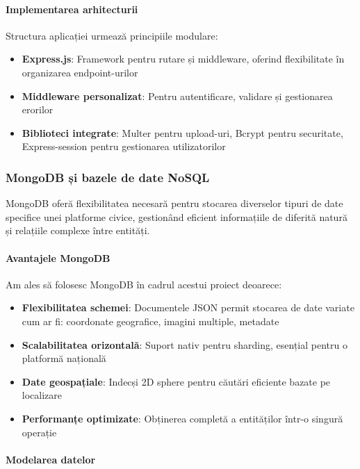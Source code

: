 \documentclass[12pt,a4paper]{report}
\begin{document}
\paragraph{Implementarea arhitecturii}

Structura aplicației urmează principiile modulare:

\begin{itemize}
    \item \textbf{Express.js}: Framework pentru rutare și middleware, oferind flexibilitate în organizarea endpoint-urilor
    \item \textbf{Middleware personalizat}: Pentru autentificare, validare și gestionarea erorilor
    \item \textbf{Biblioteci integrate}: Multer pentru upload-uri, Bcrypt pentru securitate, Express-session pentru gestionarea utilizatorilor
\end{itemize}

\subsubsection{MongoDB și bazele de date NoSQL}

MongoDB oferă flexibilitatea necesară pentru stocarea diverselor tipuri de date specifice unei platforme civice, gestionând eficient informațiile de diferită natură și relațiile complexe între entități.

\paragraph{Avantajele MongoDB}

Am ales să folosesc MongoDB în cadrul acestui proiect deoarece:

\begin{itemize}
    \item \textbf{Flexibilitatea schemei}: Documentele JSON permit stocarea de date variate cum ar fi: coordonate geografice, imagini multiple, metadate
    \item \textbf{Scalabilitatea orizontală}: Suport nativ pentru sharding, esențial pentru o platformă națională
    \item \textbf{Date geospațiale}: Indecși 2D sphere pentru căutări eficiente bazate pe localizare
    \item \textbf{Performanțe optimizate}: Obținerea completă a entităților într-o singură operație
\end{itemize}

\paragraph{Modelarea datelor}
\end{document}
